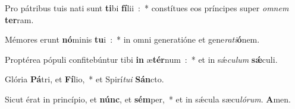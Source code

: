 \item Pro pátribus tuis nati sunt \textbf{ti}bi \textbf{fí}lii~:~* constítues eos príncipes super \emph{om}\emph{nem} \textbf{ter}ram.
\item Mémores erunt \textbf{nó}minis \textbf{tu}i~:~* in omni ge\-ne\-ra\-ti\-ó\-ne et gene\emph{ra}\emph{ti}\textbf{ó}nem.
\item Proptérea pópuli confitebúntur tibi \textbf{in} æ\textbf{tér}num~:~* et in sǽ\emph{cu}\emph{lum} \textbf{sǽ}culi.
\item Glória \textbf{Pá}tri, et \textbf{Fí}lio,~* et Spirí\emph{tu}\emph{i} \textbf{Sán}cto.
\item Sicut érat in princípio, et \textbf{núnc}, et \textbf{sém}per,~* et in sǽcula sæcu\emph{ló}\emph{rum}. \textbf{A}men.
